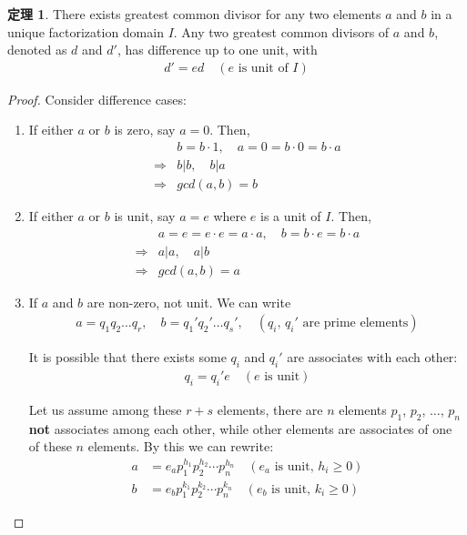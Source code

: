 \documentclass[utf8]{ctexbook}
\theoremstyle{definition}
\newtheorem{prototheorem}{定理}[section]
\newenvironment{theorem}
   {\colorlet{shadecolor}{red!30}\begin{shaded}\begin{prototheorem}}
   {\end{prototheorem}\end{shaded}}
\begin{document}
\begin{theorem}\label{theorem_UDF_GCD_existence_unique_up_to_unit}
There exists greatest common divisor for any two elements $a$ and $b$ in a unique factorization domain $I$. Any two greatest common divisors of $a$ and $b$, denoted as $d$ and $d'$, has difference up to one unit, with
\begin{align*}
d' = e d \quad (e \mbox{ is unit of } I)
\end{align*} 
\end{theorem}

\begin{proof}
Consider difference cases:
\begin{enumerate}
\item{If either $a$ or $b$ is zero, say $a=0$. Then, 
\begin{align*}
& b = b \cdot 1,\quad a = 0 = b \cdot 0 = b \cdot a \\
 \Longrightarrow & b | b, \quad b | a \\
 \Longrightarrow & gcd(a,b) = b 
\end{align*}
}
\item{If either $a$ or $b$ is unit, say $a=e$ where $e$ is a unit of $I$. Then,
\begin{align*}
& a = e = e \cdot e = a \cdot a, \quad b = b \cdot e = b \cdot a \\
\Longrightarrow & a | a, \quad a | b \\
\Longrightarrow & gcd(a,b) = a 
\end{align*}
}
\item{If $a$ and $b$ are non-zero, not unit. We can write
\begin{align*}
a = q_1 q_2 \ldots q_r, \quad b = q_1 ' q_2 ' \ldots q_s ' , \quad (q_i, \, q_i ' \mbox{ are prime elements})
\end{align*}

It is possible that there exists some $q_i$ and $q_i '$ are associates with each other:
\begin{align*}
q_i = q_i ' e \quad (e \mbox{ is unit})
\end{align*}

Let us assume among these $r+s$ elements, there are $n$ elements $p_1$, $p_2$, $\ldots$, $p_n$ \textbf{not} associates among each other, while other elements are associates of one of these $n$ elements. By this we can rewrite:
\begin{align*}
a &= e_a p_1 ^{h_1} p_2 ^{h_2} \cdots p_n ^{h_n} \quad (e_a \mbox{ is unit},\, h_i \geq 0) \\
b&= e_b p_1 ^{k_1} p_2 ^{k_2} \cdots p_n ^{k_n} \quad (e_b \mbox{ is unit}, \, k_i \geq 0 )   
\end{align*}

}
\end{enumerate}
\end{proof}
\end{document}
